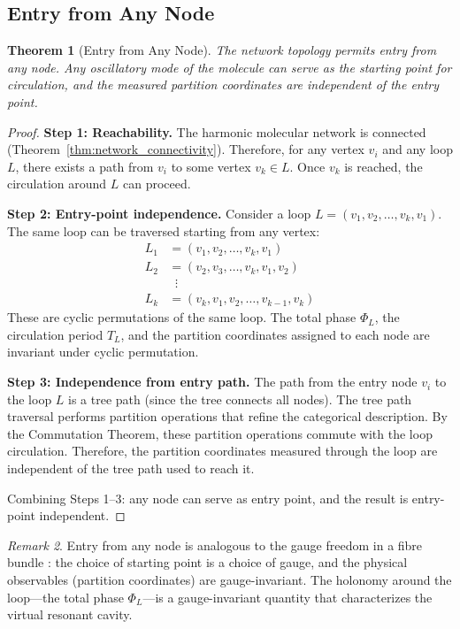 \documentclass[11pt,a4paper]{article}
\newtheorem{theorem}{Theorem}[section]
\theoremstyle{definition}
\theoremstyle{remark}
\newtheorem{remark}[theorem]{Remark}
\begin{document}
\subsection{Entry from Any Node}

\begin{theorem}[Entry from Any Node]
\label{thm:entry_any_node}
The network topology permits entry from any node. Any oscillatory mode of the molecule can serve as the starting point for circulation, and the measured partition coordinates are independent of the entry point.
\end{theorem}

\begin{proof}
\textbf{Step 1: Reachability.} The harmonic molecular network is connected (Theorem~\ref{thm:network_connectivity}). Therefore, for any vertex $v_i$ and any loop $L$, there exists a path from $v_i$ to some vertex $v_k \in L$. Once $v_k$ is reached, the circulation around $L$ can proceed.

\textbf{Step 2: Entry-point independence.} Consider a loop $L = (v_1, v_2, \ldots, v_k, v_1)$. The same loop can be traversed starting from any vertex:
\begin{align}
L_1 &= (v_1, v_2, \ldots, v_k, v_1) \\
L_2 &= (v_2, v_3, \ldots, v_k, v_1, v_2) \\
&\;\;\vdots \\
L_k &= (v_k, v_1, v_2, \ldots, v_{k-1}, v_k)
\end{align}
These are cyclic permutations of the same loop. The total phase $\Phi_L$, the circulation period $T_L$, and the partition coordinates assigned to each node are invariant under cyclic permutation.

\textbf{Step 3: Independence from entry path.} The path from the entry node $v_i$ to the loop $L$ is a tree path (since the tree connects all nodes). The tree path traversal performs partition operations that refine the categorical description. By the Commutation Theorem, these partition operations commute with the loop circulation. Therefore, the partition coordinates measured through the loop are independent of the tree path used to reach it.

Combining Steps 1--3: any node can serve as entry point, and the result is entry-point independent.
\end{proof}

\begin{remark}
Entry from any node is analogous to the gauge freedom in a fibre bundle \citep{nakahara2003}: the choice of starting point is a choice of gauge, and the physical observables (partition coordinates) are gauge-invariant. The holonomy around the loop---the total phase $\Phi_L$---is a gauge-invariant quantity that characterizes the virtual resonant cavity.
\end{remark}
\end{document}
